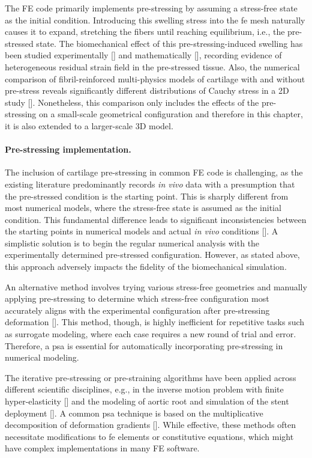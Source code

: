 \documentclass[12pt,a4paper]{report}
\begin{document}
The FE code primarily implements pre-stressing by assuming a stress-free state as the initial condition. Introducing this swelling stress into the \ac{fe} mesh naturally causes it to expand, stretching the fibers until reaching equilibrium, i.e., the pre-stressed state. The biomechanical effect of this pre-stressing-induced swelling has been studied experimentally [\cite{narmoneva1999}] and mathematically [\cite{setton1996}], recording evidence of heterogeneous residual strain field in the pre-stressed tissue. Also, the numerical comparison of fibril-reinforced multi-physics models of cartilage with and without pre-stress reveals significantly different distributions of Cauchy stress in a 2D study [\cite{wang2018}]. Nonetheless, this comparison only includes the effects of the pre-stressing on a small-scale geometrical configuration and therefore in this chapter, it is also extended to a larger-scale 3D model.

\paragraph{Pre-stressing implementation.} The inclusion of cartilage pre-stressing in common FE code is challenging, as the existing literature predominantly records \textit{in vivo} data with a presumption that the pre-stressed condition is the starting point. This is sharply different from most numerical models, where the stress-free state is assumed as the initial condition. This fundamental difference leads to significant inconsistencies between the starting points in numerical models and actual \textit{in vivo} conditions [\cite{wang2018}]. A simplistic solution is to begin the regular numerical analysis with the experimentally determined pre-stressed configuration. However, as stated above, this approach adversely impacts the fidelity of the biomechanical simulation.

An alternative method involves trying various stress-free geometries and manually applying pre-stressing to determine which stress-free configuration most accurately aligns with the experimental configuration after pre-stressing deformation [\cite{sajjadinia2019,stender2016}]. This method, though, is highly inefficient for repetitive tasks such as surrogate modeling, where each case requires a new round of trial and error. Therefore, a \ac{psa} is essential for automatically incorporating pre-stressing in numerical modeling.

The iterative pre-stressing or pre-straining algorithms have been applied across different scientific disciplines, e.g., in the inverse motion problem with finite hyper-elasticity [\cite{govindjee1996}] and the modeling of aortic root and simulation of the stent deployment [\cite{caimi2020,votta2017}]. A common \ac{psa} technique is based on the multiplicative decomposition of deformation gradients [\cite{gee2010,weisbecker2014,pierce2015,zahn2016}]. While effective, these methods often necessitate modifications to \ac{fe} elements or constitutive equations, which might have complex implementations in many FE software.
\end{document}
